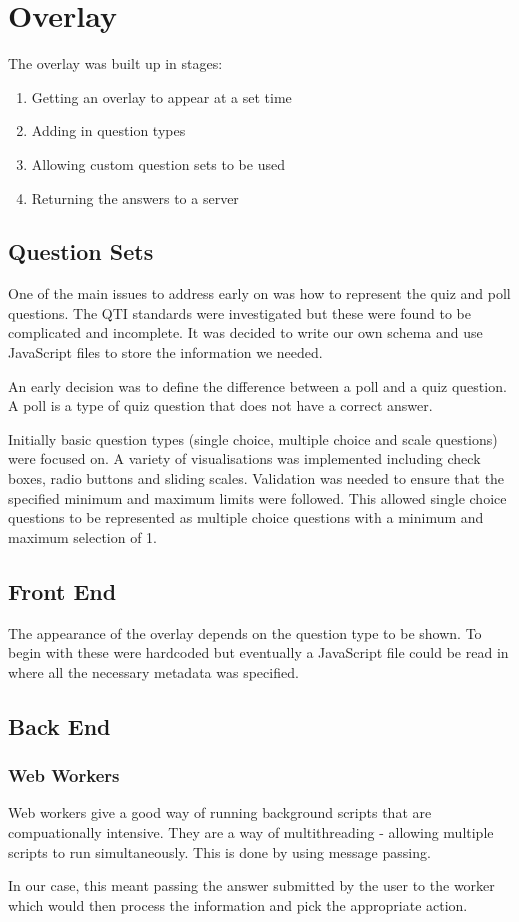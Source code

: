 \chapter{Overlay} \label{Chapter:Overlay}
The overlay was built up in stages:
\begin{enumerate}
\item Getting an overlay to appear at a set time
\item Adding in question types
\item Allowing custom question sets to be used
\item Returning the answers to a server
\end{enumerate}
\section{Question Sets} 
\label{Section:Question sets}
One of the main issues to address early on was how to represent the quiz and poll questions. The QTI standards were investigated but these were found to be complicated and incomplete. It was decided to write our own schema and use JavaScript files to store the information we needed. 

An early decision was to define the difference between a poll and a quiz question. A poll is a type of quiz question that does not have a correct answer.

Initially basic question types (single choice, multiple choice and scale questions) were focused on. A variety of visualisations was implemented including check boxes, radio buttons and sliding scales. Validation was needed to ensure that the specified minimum and maximum limits were followed. This allowed single choice questions to be represented as multiple choice questions with a minimum and maximum selection of 1.
\section{Front End} 
\label{Section:Front end}
The appearance of the overlay depends on the question type to be shown. To begin with these were hardcoded but eventually a JavaScript file could be read in where all the necessary metadata was specified.
\section{Back End} 
\label{Section:Back end}
\subsection{Web Workers}
\label{Subsection:WebWorkers}
Web workers give a good way of running background scripts that are compuationally intensive. They are a way of multithreading - allowing multiple scripts to run simultaneously. This is done by using message passing. 

In our case, this meant passing the answer submitted by the user to the worker which would then process the information and pick the appropriate action.